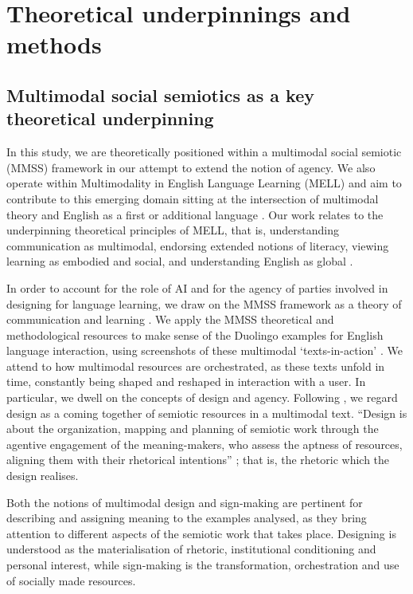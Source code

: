 \documentclass[english]{textolivre}
\begin{document}
\section{Theoretical underpinnings and methods}\label{sec-conduta}
\subsection{Multimodal social semiotics as a key theoretical underpinning}
In this study, we are theoretically positioned within a multimodal social semiotic (MMSS) framework in our attempt to extend the notion of agency. We also operate within Multimodality in English Language Learning (MELL) and aim to contribute to this emerging domain sitting at the intersection of multimodal theory and English as a first or additional language \cite{diamantopoulou2025mell}. Our work relates to the underpinning theoretical principles of MELL, that is, understanding communication as multimodal, endorsing extended notions of literacy, viewing learning as embodied and social, and understanding English as global \cite{diamantopoulou2022multimodality,diamantopoulou2025mell}.

In order to account for the role of AI and for the agency of parties involved in designing for language learning, we draw on the MMSS framework as a theory of communication and learning \cite{bezemer2016multimodality,kress2010multimodality}. We apply the MMSS theoretical and methodological resources to make sense of the Duolingo examples for English language interaction, using screenshots of these multimodal ‘texts-in-action’ \cite{jewitt2021editorial}. We attend to how multimodal resources are orchestrated, as these texts unfold in time, constantly being shaped and reshaped in interaction with a user. In particular, we dwell on the concepts of design and agency. Following \textcite{kress2010multimodality}, we regard design as a coming together of semiotic resources in a multimodal text. “Design is about the organization, mapping and planning of semiotic work through the agentive engagement of the meaning-makers, who assess the aptness of resources, aligning them with their rhetorical intentions” \cite{diamantopoulou2026social}; that is, the rhetoric which the design realises.

Both the notions of multimodal design and sign-making are pertinent for describing and assigning meaning to the examples analysed, as they bring attention to different aspects of the semiotic work that takes place. Designing is understood as the materialisation of rhetoric, institutional conditioning and personal interest, while sign-making is the transformation, orchestration and use of socially made resources.
\end{document}
